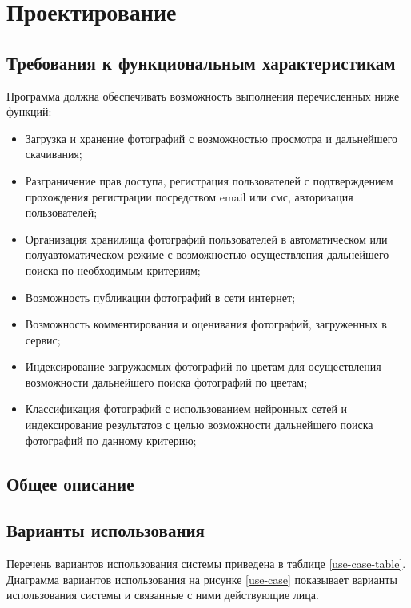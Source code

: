\section{Проектирование}
\subsection{Требования к функциональным характеристикам}
Программа должна обеспечивать возможность выполнения перечисленных ниже функций:
\begin{itemize}
  \item Загрузка и хранение фотографий с возможностью просмотра и дальнейшего скачивания;
  \item Разграничение прав доступа, регистрация пользователей с подтверждением прохождения регистрации посредством email или смс, авторизация пользователей;
  \item Организация хранилища фотографий пользователей в автоматическом или полуавтоматическом режиме с возможностью осуществления дальнейшего поиска по необходимым критериям;
  \item Возможность публикации фотографий в сети интернет;
  \item Возможность комментирования и оценивания фотографий, загруженных в сервис;
  \item Индексирование загружаемых фотографий по цветам для осуществления возможности дальнейшего поиска фотографий по цветам;
  \item Классификация фотографий с использованием нейронных сетей и индексирование результатов с целью возможности дальнейшего поиска фотографий по данному критерию;
\end{itemize}
\subsection{Общее описание}
\subsection{Варианты использования}
Перечень вариантов использования системы приведена в таблице \ref{use-case-table}.
Диаграмма вариантов использования на рисунке \ref{use-case} показывает варианты использования системы и связанные с ними действующие лица.

